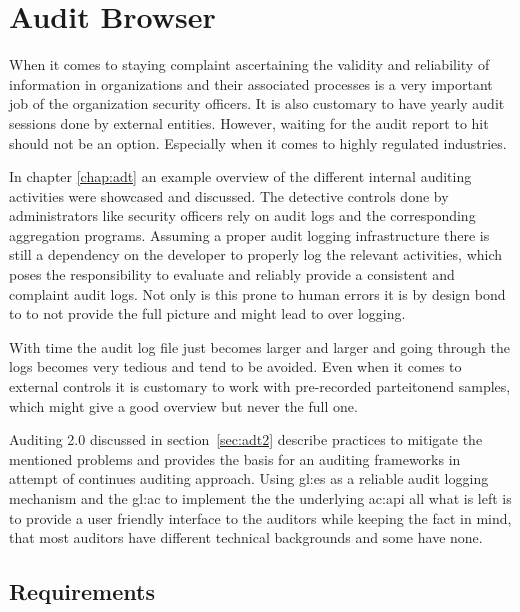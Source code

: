 %
\chapter{Audit Browser}\label{chap:ab}

When it comes to staying complaint ascertaining the validity and reliability of information in organizations and their associated processes is a very important job of the organization security officers. It is also customary to have yearly audit sessions done by external entities. However, waiting for the audit report to hit should not be an option. Especially when it comes to highly regulated industries.

In chapter \ref{chap:adt} an example overview of the different internal auditing activities were showcased and discussed. The detective controls done by administrators like security officers rely on audit logs and the corresponding aggregation programs. Assuming a proper audit logging infrastructure there is still a dependency on the developer to properly log the relevant activities, which poses the responsibility to evaluate and reliably provide a consistent and complaint audit logs. Not only is this prone to human errors it is by design bond to to not provide the full picture and might lead to over logging. 

With time the audit log file just becomes larger and larger and going through the logs becomes very tedious and tend to be avoided. Even when it comes to external controls it is customary to work with pre-recorded parteitonend samples, which might give a good overview but never the full one. 

Auditing 2.0 discussed in section~\ref{sec:adt2} describe practices to mitigate the mentioned problems and provides the basis for an auditing frameworks in attempt of continues auditing approach. Using \gls{gl:es} as a reliable audit logging mechanism and the \gls{gl:ac} to implement the the underlying \gls{ac:api} all what is left is to provide a user friendly interface to the auditors while keeping the fact in mind, that most auditors have different technical backgrounds and some have none.


\section{Requirements}

